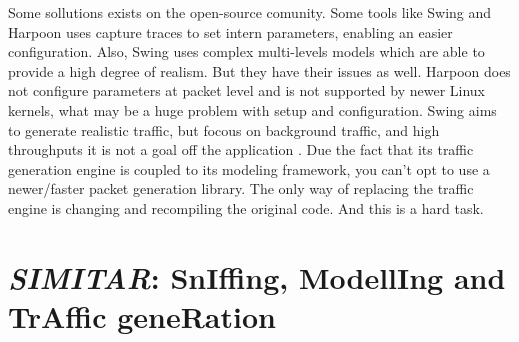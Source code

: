 Some sollutions exists on the open-source comunity. Some tools like Swing and Harpoon uses capture traces to set intern parameters, enabling an easier configuration. Also, Swing uses complex multi-levels models which are able to provide a high degree of realism\cite{swing-paper}. But they have their issues as well. Harpoon does not configure parameters at packet level\cite{harpoon-paper} and is not supported by newer Linux kernels, what may be a huge problem with setup and configuration. Swing\cite{swing-paper} aims to generate realistic traffic, but focous on background traffic, and high throughputs it is not a goal off the application\cite{swing-paper} \cite{legotg-paper}. Due the fact that its traffic generation engine is coupled to its modeling framework, you can't opt to use a newer/faster packet generation library. The only way of replacing the traffic engine is changing and recompiling the original code. And this is a hard task\cite{legotg-paper}.






\section{\textit{SIMITAR}: SnIffing, ModellIng and TrAffic geneRation}

